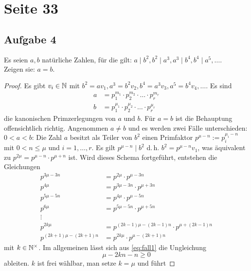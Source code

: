 \section{Seite 33}

\subsection{Aufgabe 4}
Es seien $a, b$ natürliche Zahlen, für die gilt:
$a \mid b^2, b^2 \mid a^3, a^3 \mid b^4, b^4 \mid a^5, \dots$.\\
Zeigen sie: $a = b$.

\begin{proof}
Es gibt $v_i \in \mathbb{N}{}$ mit
$b^2 = av_1, a^3 = b^2v_2, b^4 = a^3v_3, a^5 = b^4v_4, \dotsc$.
Es sind
\begin{align*}
  a & = p_1^{m_1} \cdot p_2^{m_2} \cdot \ldots \cdot p_r^{m_r} \\
  b & = p_1^{\mu_1} \cdot p_2^{\mu_2} \cdot \ldots \cdot p_r^{\mu_r}
\end{align*}
die kanonischen Primzerlegungen von $a$ und $b$.
Für $a = b$ ist die Behauptung offensichtlich richtig.
Angenommen $a \neq b$ und es werden zwei Fälle unterschieden: \\[4pt]
$0 < a < b$: Die Zahl $a$ besitzt als Teiler von $b^2$ einen Primfaktor
$p^{\mu - n} := p_i^{\mu_i - n}$ mit $0 < n \leq \mu$ und $i = 1,\dotsc,r$.
Es gilt $p^{\mu - n} \mid b^2$
d.\,h. $b^2 = p^{\mu - n}v_1$, was äquivalent zu
$p^{2\mu} = p^{\mu - n} \cdot p^{\mu + n}$ ist.
Wird dieses Schema fortgeführt, entstehen die Gleichungen
\begin{align*}
p^{3\mu - 3n} & = p^{2\mu}      \cdot p^{\mu - 3n} \\
p^{4\mu}      & = p^{3\mu - 3n} \cdot p^{\mu + 3n} \\
p^{5\mu - 5n} & = p^{4\mu}      \cdot p^{\mu - 5n} \\
p^{6\mu}      & = p^{5\mu - 5n} \cdot p^{\mu + 5n} \\
\vdots \\
p^{2k\mu} & = p^{(2k - 1)\mu - (2k - 1)n} \cdot p^{\mu + (2k - 1)n}  \\
\label{eq:fall1} \tag{$*$}
p^{(2k + 1)\mu - (2k + 1)n} & = p^{2k\mu} \cdot p^{\mu - (2k + 1)n}
\end{align*}
mit $k \in \mathbb{N}^\times{}$. Im allgemeinen lässt sich aus \eqref{eq:fall1}
die Ungleichung
\begin{equation*}
\mu - 2kn - n \geq 0
\end{equation*}
ableiten. $k$ ist frei wählbar, man setze $k = \mu$ und führt

\end{proof}
